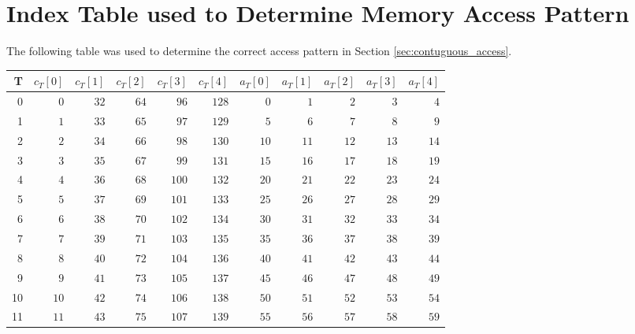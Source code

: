 \section{Index Table used to Determine Memory Access Pattern}
The following table was used to determine the correct access pattern in Section \ref{sec:contuguous_access}.
\begin{table}[H]
    \small
    \begin{tabular}{r|rrrrr|rrrrr}
        T  & $c_T[0]$ & $c_T[1]$ & $c_T[2]$ & $c_T[3]$ & $c_T[4]$ & $a_T[0]$ & $a_T[1]$ & $a_T[2]$ & $a_T[3]$ & $a_T[4]$ \\
        \hline

        0  & $0$      & $32$     & $64$     & $96$     & $128$    & $0$      & $1$      & $2$      & $3$      & $4$      \\
        1  & $1$      & $33$     & $65$     & $97$     & $129$    & $5$      & $6$      & $7$      & $8$      & $9$      \\
        2  & $2$      & $34$     & $66$     & $98$     & $130$    & $10$     & $11$     & $12$     & $13$     & $14$     \\
        3  & $3$      & $35$     & $67$     & $99$     & $131$    & $15$     & $16$     & $17$     & $18$     & $19$     \\
        4  & $4$      & $36$     & $68$     & $100$    & $132$    & $20$     & $21$     & $22$     & $23$     & $24$     \\
        5  & $5$      & $37$     & $69$     & $101$    & $133$    & $25$     & $26$     & $27$     & $28$     & $29$     \\
        6  & $6$      & $38$     & $70$     & $102$    & $134$    & $30$     & $31$     & $32$     & $33$     & $34$     \\
        7  & $7$      & $39$     & $71$     & $103$    & $135$    & $35$     & $36$     & $37$     & $38$     & $39$     \\
        8  & $8$      & $40$     & $72$     & $104$    & $136$    & $40$     & $41$     & $42$     & $43$     & $44$     \\
        9  & $9$      & $41$     & $73$     & $105$    & $137$    & $45$     & $46$     & $47$     & $48$     & $49$     \\
        10 & $10$     & $42$     & $74$     & $106$    & $138$    & $50$     & $51$     & $52$     & $53$     & $54$     \\
        11 & $11$     & $43$     & $75$     & $107$    & $139$    & $55$     & $56$     & $57$     & $58$     & $59$     \\

\end{tabular}
\end{table}
